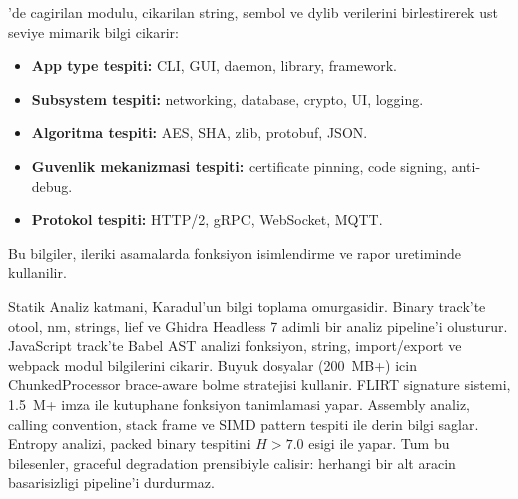 'de cagirilan  modulu, cikarilan string, sembol ve dylib verilerini birlestirerek ust seviye mimarik bilgi cikarir:

\begin{itemize}
\item \textbf{App type tespiti:} CLI, GUI, daemon, library, framework.
\item \textbf{Subsystem tespiti:} networking, database, crypto, UI, logging.
\item \textbf{Algoritma tespiti:} AES, SHA, zlib, protobuf, JSON.
\item \textbf{Guvenlik mekanizmasi tespiti:} certificate pinning, code signing, anti-debug.
\item \textbf{Protokol tespiti:} HTTP/2, gRPC, WebSocket, MQTT.
\end{itemize}

Bu bilgiler, ileriki asamalarda fonksiyon isimlendirme ve rapor uretiminde kullanilir.


\begin{ozet}
Statik Analiz katmani, Karadul'un bilgi toplama omurgasidir. Binary track'te otool, nm, strings, lief ve Ghidra Headless 7 adimli bir analiz pipeline'i olusturur. JavaScript track'te Babel AST analizi fonksiyon, string, import/export ve webpack modul bilgilerini cikarir. Buyuk dosyalar (200~MB+) icin ChunkedProcessor brace-aware bolme stratejisi kullanir. FLIRT signature sistemi, 1.5~M+ imza ile kutuphane fonksiyon tanimlamasi yapar. Assembly analiz, calling convention, stack frame ve SIMD pattern tespiti ile derin bilgi saglar. Entropy analizi, packed binary tespitini $H > 7.0$ esigi ile yapar. Tum bu bilesenler, graceful degradation prensibiyle calisir: herhangi bir alt aracin basarisizligi pipeline'i durdurmaz.
\end{ozet}
